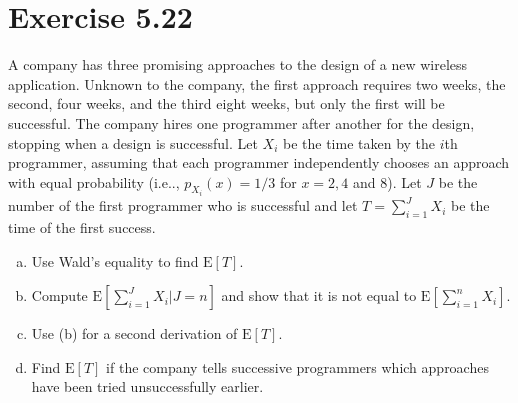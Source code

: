 \documentclass{article}
\begin{document}
    \section{Exercise 5.22}
    A company has three promising approaches to the design of a new wireless application. Unknown to the company, the first approach requires two weeks, the second, four weeks, and the third eight weeks, but only the first will be successful. The company hires one programmer after another for the design, stopping when a design is successful. Let $X_i$ be the time taken by the $i$th programmer, assuming that each programmer independently chooses an approach with equal probability (i.e.., $p_{X_i}(x)=1/3$ for $x=2,4$ and 8). Let $J$ be the number of the first programmer who is successful and let $T=\sum_{i=1}^JX_i$ be the time of the first success.
    \begin{enumerate}[(a)]
        \item Use Wald's equality to find $\text{E}[T]$.
        \item Compute $\text{E}[\sum_{i=1}^JX_i|J=n]$ and show that it is not equal to $\text{E}[\sum_{i=1}^nX_i]$.
        \item Use (b) for a second derivation of $\text{E}[T]$.
        \item Find $\text{E}[T]$ if the company tells successive programmers which approaches have been tried unsuccessfully earlier.
    \end{enumerate}
\end{document}
